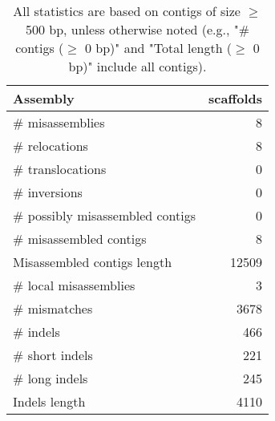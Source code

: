 \documentclass[12pt,a4paper]{article}
\begin{document}
\begin{table}[ht]
\begin{center}
\caption{All statistics are based on contigs of size $\geq$ 500 bp, unless otherwise noted (e.g., "\# contigs ($\geq$ 0 bp)" and "Total length ($\geq$ 0 bp)" include all contigs).}
\begin{tabular}{|l*{1}{|r}|}
\hline
Assembly & scaffolds \\ \hline
\# misassemblies & 8 \\ \hline
\hspace{5mm}\# relocations & 8 \\ \hline
\hspace{5mm}\# translocations & 0 \\ \hline
\hspace{5mm}\# inversions & 0 \\ \hline
\# possibly misassembled contigs & 0 \\ \hline
\# misassembled contigs & 8 \\ \hline
Misassembled contigs length & 12509 \\ \hline
\# local misassemblies & 3 \\ \hline
\# mismatches & 3678 \\ \hline
\# indels & 466 \\ \hline
\hspace{5mm}\# short indels & 221 \\ \hline
\hspace{5mm}\# long indels & 245 \\ \hline
Indels length & 4110 \\ \hline
\end{tabular}
\end{center}
\end{table}
\end{document}
